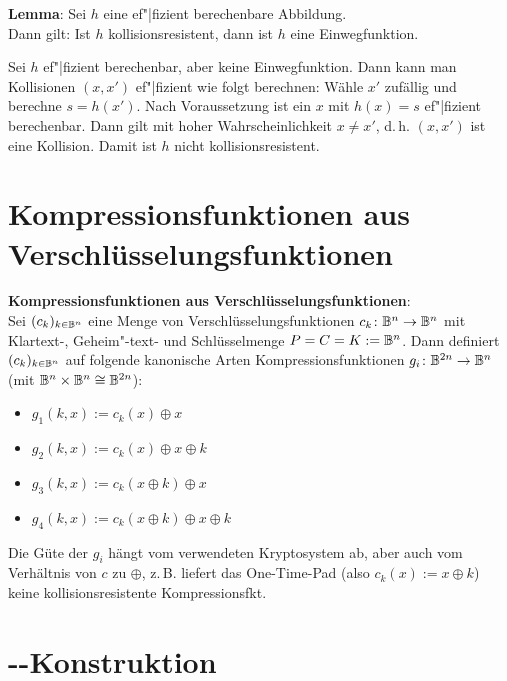 \textbf{Lemma}:
Sei $h$ eine ef"|fizient berechenbare Abbildung.\\
Dann gilt: Ist $h$ kollisionsresistent, dann ist $h$ eine Einwegfunktion.

\begin{Beweis}
    Sei $h$ ef"|fizient berechenbar, aber keine Einwegfunktion.
    Dann kann man Kollisionen $(x, x')$ ef"|fizient wie folgt berechnen:
    Wähle $x'$ zufällig und berechne $s = h(x')$.
    Nach Voraussetzung ist ein $x$ mit $h(x) = s$ ef"|fizient berechenbar.
    Dann gilt mit hoher Wahrscheinlichkeit $x \not= x'$,
    d.\,h. $(x, x')$ ist eine Kollision.
    Damit ist $h$ nicht kollisionsresistent.
\end{Beweis}

\section{%
    Kompressionsfunktionen aus Verschlüsselungsfunktionen%
}

\textbf{Kompressionsfunktionen aus Verschlüsselungsfunktionen}:\\
Sei $(c_k)_{k \in \mathbb{B}^n}$ eine Menge von Verschlüsselungsfunktionen $c_k\colon \mathbb{B}^n \to \mathbb{B}^n$
mit Klartext-, Geheim"-text- und Schlüsselmenge $P = C = K := \mathbb{B}^n$.
Dann definiert $(c_k)_{k \in \mathbb{B}^n}$ auf folgende kanonische Arten Kompressionsfunktionen
$g_i\colon \mathbb{B}^{2n} \to \mathbb{B}^n$ (mit $\mathbb{B}^n \times \mathbb{B}^n \cong \mathbb{B}^{2n}$):
\begin{itemize}
    \item
    $g_1(k, x) := c_k(x) \oplus x$

    \item
    $g_2(k, x) := c_k(x) \oplus x \oplus k$

    \item
    $g_3(k, x) := c_k(x \oplus k) \oplus x$

    \item
    $g_4(k, x) := c_k(x \oplus k) \oplus x \oplus k$
\end{itemize}
Die Güte der $g_i$ hängt vom verwendeten Kryptosystem ab,
aber auch vom Verhältnis von $c$ zu $\oplus$, z.\,B. liefert das One-Time-Pad
(also $c_k(x) := x \oplus k$) keine kollisionsresistente Kompressionsfkt.

\pagebreak

\section{%
    --Konstruktion%
}

